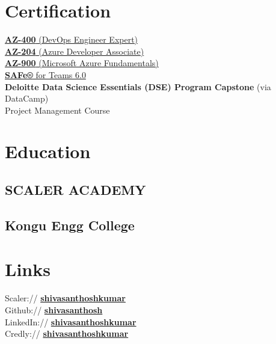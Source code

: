 \documentclass[]{deedy-resume-openfont}
\begin{document}
\begin{minipage}[t]{0.33\textwidth}
\section{Certification} 

\href{https://www.credly.com/badges/b6ecb375-6bad-4ba3-a621-4bfafcd50f4f/public_url}{\textbf{AZ-400} (DevOps Engineer Expert)} \\
\href{https://www.credly.com/badges/7ff91383-901b-493e-b8cc-fcffab306ff6?source=linked_in_profile}{\textbf{AZ-204} (Azure Developer Associate)} \\
\href{https://www.credly.com/badges/2a82bf49-fe81-4faf-a22a-2ba87fefda26?source=linked_in_profile}{\textbf{AZ-900} (Microsoft Azure Fundamentals)} \\
\href{https://www.credly.com/earner/earned/badge/61123942-a068-45e5-98be-1f078245a222}{\textbf{SAFe®} for Teams 6.0}\\
\textbf{Deloitte Data Science Essentials (DSE) Program Capstone} (via DataCamp)\\
Project Management Course\\

\section{Education} 

\subsection{SCALER ACADEMY }
\sectionsep

\subsection{Kongu Engg College}
\sectionsep



\section{Links} 
Scaler://  \href{https://www.scaler.com/academy/profile/6cb69ccf7d1c}{\bf shivasanthoshkumar} \\ 
Github:// \href{https://github.com/shivasanthosh}{\bf shivasanthosh} \\
LinkedIn://  \href{https://www.linkedin.com/in/shivasanthoshkumar}{\bf shivasanthoshkumar}\\
Credly://  \href{https://www.credly.com/users/shiva-santhosh-kumar-sivakumar/badges}{\bf shivasanthoshkumar}



\end{minipage}
\end{document}
